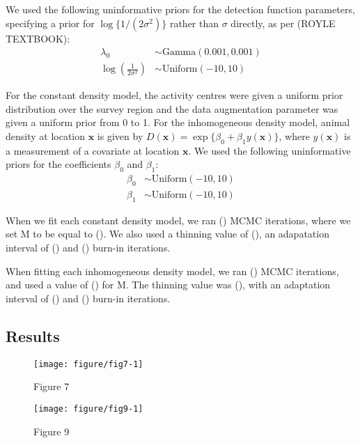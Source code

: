 \documentclass[10pt,a4paper]{article}\usepackage[]{graphicx}\usepackage[]{color}
\makeatletter
\def\maxwidth{ %
  \ifdim\Gin@nat@width>\linewidth
    \linewidth
  \else
    \Gin@nat@width
  \fi
}
\newenvironment{knitrout}{}{} %
\makeatother
\begin{document}
We used the following uninformative priors for the detection function
parameters, specifying a prior for $\log\{1/(2\sigma^2)\}$ rather than
$\sigma$ directly, as per (ROYLE TEXTBOOK):
\begin{align*}
  \lambda_0 &\sim \text{Gamma}(0.001, 0.001) \\ 
  \log\left(\frac{1}{2\sigma^2}\right) &\sim \text{Uniform}(-10, 10)
\end{align*}

For the constant density model, the activity centres were given a
uniform prior distribution over the survey region and the data
augmentation parameter was given a uniform prior from 0 to 1. For the
inhomogeneous density model, animal density at location $\bm{x}$ is
given by $D(\bm{x}) = \exp\{\beta_0 + \beta_1 y(\bm{x})\}$, where
$y(\bm{x})$ is a measurement of a covariate at location $\bm{x}$. We
used the following uninformative priors for the coefficients $\beta_0$
and $\beta_1$:
\begin{align*}
\beta_0 &\sim \text{Uniform}(-10, 10) \\
\beta_1 &\sim \text{Uniform}(-10, 10)
\end{align*}

When we fit each constant density model, we ran () MCMC iterations,
where we set M to be equal to (). We also used a thinning value of (),
an adapatation interval of () and () burn-in iterations.

When fitting each inhomogeneous density model, we ran () MCMC iterations,
and used a value of () for M. The thinning value was (), with an adaptation
interval of () and () burn-in iterations.

\subsection{Results}
\label{sec:appendix-results}

\begin{knitrout}
\color{fgcolor}\begin{figure}
\texttt{[image: figure/fig7-1]} \caption[Figure 7]{Figure 7}\label{fig:fig7}
\end{figure}

\end{knitrout}

\begin{knitrout}
\color{fgcolor}\begin{figure}
\texttt{[image: figure/fig9-1]} \caption[Figure 9]{Figure 9}\label{fig:fig9}
\end{figure}

\end{knitrout}
\end{document}
